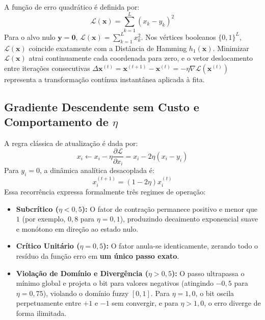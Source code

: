 \documentclass[
	12pt,
	a4paper,
	article,
	twocolumn,
	brazil
]{abntex2}
\begin{document}
A função de erro quadrático é definida por:
\begin{equation}
\mathcal{L}(\mathbf{x}) = \sum_{k=1}^L (x_k - y_k)^2
\end{equation}
Para o alvo nulo $\mathbf{y} = \mathbf{0}$, $\mathcal{L}(\mathbf{x}) = \sum_{k=1}^L x_k^2$. Nos vértices booleanos $\{0, 1\}^L$, $\mathcal{L}(\mathbf{x})$ coincide exatamente com a Distância de Hamming $h_1(\mathbf{x})$. Minimizar $\mathcal{L}(\mathbf{x})$ atrai continuamente cada coordenada para zero, e o vetor deslocamento entre iterações consecutivas $\Delta \mathbf{x}^{(t)} = \mathbf{x}^{(t+1)} - \mathbf{x}^{(t)} = -\eta \nabla \mathcal{L}(\mathbf{x}^{(t)})$ representa a transformação contínua instantânea aplicada à fita.

\subsection{Gradiente Descendente sem Custo e Comportamento de \texorpdfstring{$\eta$}{eta}}

A regra clássica de atualização é dada por:
\begin{equation}
x_i \leftarrow x_i - \eta \frac{\partial \mathcal{L}}{\partial x_i} = x_i - 2\eta (x_i - y_i)
\end{equation}
Para $y_i = 0$, a dinâmica analítica desacoplada é:
\begin{equation}
x_i^{(t+1)} = (1 - 2\eta) x_i^{(t)}
\end{equation}
Essa recorrência expressa formalmente três regimes de operação:
\begin{itemize}[nosep]
    \item \textbf{Subcrítico ($\eta < 0{,}5$):} O fator de contração permanece positivo e menor que $1$ (por exemplo, $0{,}8$ para $\eta = 0{,}1$), produzindo decaimento exponencial suave e monótono em direção ao estado nulo.
    \item \textbf{Crítico Unitário ($\eta = 0{,}5$):} O fator anula-se identicamente, zerando todo o resíduo da função erro em \textbf{um único passo exato}.
    \item \textbf{Violação de Domínio e Divergência ($\eta > 0{,}5$):} O passo ultrapassa o mínimo global e projeta o bit para valores negativos (atingindo $-0{,}5$ para $\eta = 0{,}75$), violando o domínio fuzzy $[0, 1]$. Para $\eta = 1{,}0$, o bit oscila perpetuamente entre $+1$ e $-1$ sem convergir, e para $\eta > 1{,}0$, o erro diverge de forma ilimitada.
\end{itemize}
\end{document}
